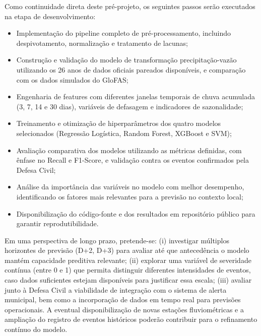 \documentclass[12pt]{article}
\begin{document}
Como continuidade direta deste pré-projeto, os seguintes passos serão executados na etapa de desenvolvimento:

\begin{itemize}
    \item Implementação do pipeline completo de pré-processamento, incluindo despivotamento, normalização e tratamento de lacunas;
    \item Construção e validação do modelo de transformação precipitação-vazão utilizando os 26 anos de dados oficiais pareados disponíveis, e comparação com os dados simulados do GloFAS;
    \item Engenharia de features com diferentes janelas temporais de chuva acumulada (3, 7, 14 e 30 dias), variáveis de defasagem e indicadores de sazonalidade;
    \item Treinamento e otimização de hiperparâmetros dos quatro modelos selecionados (Regressão Logística, Random Forest, XGBoost e SVM);
    \item Avaliação comparativa dos modelos utilizando as métricas definidas, com ênfase no Recall e F1-Score, e validação contra os eventos confirmados pela Defesa Civil;
    \item Análise da importância das variáveis no modelo com melhor desempenho, identificando os fatores mais relevantes para a previsão no contexto local;
    \item Disponibilização do código-fonte e dos resultados em repositório público para garantir reprodutibilidade.
\end{itemize}

Em uma perspectiva de longo prazo, pretende-se: (i) investigar múltiplos horizontes de previsão (D+2, D+3) para avaliar até que antecedência o modelo mantém capacidade preditiva relevante; (ii) explorar uma variável de severidade contínua (entre 0 e 1) que permita distinguir diferentes intensidades de eventos, caso dados suficientes estejam disponíveis para justificar essa escala; (iii) avaliar junto à Defesa Civil a viabilidade de integração com o sistema de alerta municipal, bem como a incorporação de dados em tempo real para previsões operacionais. A eventual disponibilização de novas estações fluviométricas e a ampliação do registro de eventos históricos poderão contribuir para o refinamento contínuo do modelo.



\end{document}
